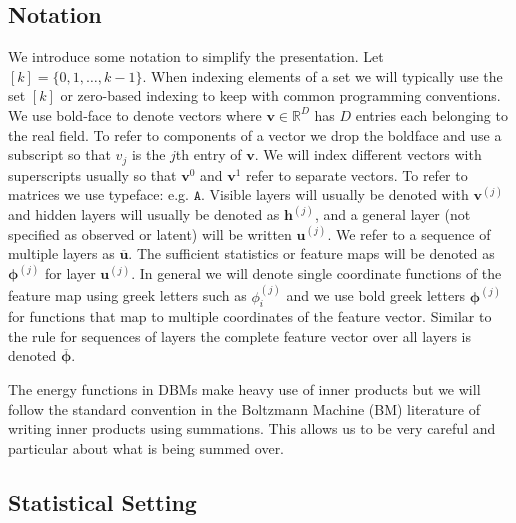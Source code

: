 \documentclass{article} %
\begin{document}
\subsection{Notation}

We introduce some notation to simplify the presentation. Let
$[k]=\{0,1,\ldots,k-1\}$.  When indexing elements of a set we will
typically use the set $[k]$ or zero-based indexing to keep with common
programming conventions.  We use bold-face to denote vectors where
$\mathbf{v}\in\mathbb{R}^D$ has $D$ entries each belonging to the real
field.  To refer to components of a vector we drop the boldface and
use a subscript so that $v_j$ is the $j$th entry of $\mathbf{v}$.  We
will index different vectors with superscripts usually so that
$\mathbf{v}^0$ and $\mathbf{v}^1$ refer to separate vectors. To refer
to matrices we use typeface: e.g. $\mathtt{A}$. Visible layers will
usually be denoted with $\mathbf{v}^{(j)}$ and hidden layers will
usually be denoted as $\mathbf{h}^{(j)}$, and a general layer (not
specified as observed or latent) will be written $\mathbf{u}^{(j)}$.
We refer to a sequence of multiple layers as $\overline{\mathbf{u}}$.
The sufficient statistics or feature maps will be denoted as $\boldsymbol{\phi}^{(j)}$
for layer $\mathbf{u}^{(j)}$.  In general we will denote single coordinate functions of the
feature map using greek letters such as $\phi^{(j)}_i$ and we use bold greek letters
$\boldsymbol{\phi}^{(j)}$ for
functions that map to multiple coordinates of the feature vector. Similar to the rule
for sequences of layers the complete feature vector over all layers is denoted $\overline{\boldsymbol{\phi}}$.


The energy functions in DBMs make heavy use of inner products but we
will follow the standard convention in the Boltzmann Machine (BM)
 literature of writing inner products using
summations.  This allows us to be very careful and particular about
what is being summed over.

\subsection{Statistical Setting}
\end{document}
